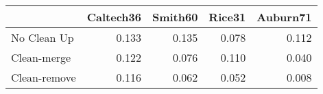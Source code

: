 \begin{tabular}{lrrrr}
\toprule
{} & Caltech36 & Smith60 & Rice31 & Auburn71 \\
\midrule
No Clean Up  &     0.133 &   0.135 &  0.078 &    0.112 \\
Clean-merge  &     0.122 &   0.076 &  0.110 &    0.040 \\
Clean-remove &     0.116 &   0.062 &  0.052 &    0.008 \\
\bottomrule
\end{tabular}
